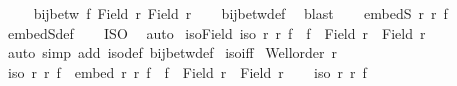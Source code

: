 \begin{isabellebody}
\ \ \isamarkupfalse%
\ {\isachardoublequoteopen}{\isasymnot}\ bij{\isacharunderscore}{\kern0pt}betw\ f\ {\isacharparenleft}{\kern0pt}Field\ r{\isacharparenright}{\kern0pt}\ {\isacharparenleft}{\kern0pt}Field\ r{\isacharprime}{\kern0pt}{\isacharparenright}{\kern0pt}{\isachardoublequoteclose}\isanewline
\ \ \isamarkupfalse%
\ bij{\isacharunderscore}{\kern0pt}betw{\isacharunderscore}{\kern0pt}def\ \isamarkupfalse%
\ blast\isanewline
\ \ \isamarkupfalse%
\ {\isachardoublequoteopen}embedS\ r\ r{\isacharprime}{\kern0pt}\ f{\isachardoublequoteclose}\ \isamarkupfalse%
\ embedS{\isacharunderscore}{\kern0pt}def\isanewline
\ \ \isamarkupfalse%
\ ISO\ \isamarkupfalse%
\ auto\isanewline
{}\isamarkupfalse%
%
\endisatagproof
{\isafoldproof}%
%
\isadelimproof
\isanewline
%
\endisadelimproof
\isanewline
{}\isamarkupfalse%
\ iso{\isacharunderscore}{\kern0pt}Field{\isacharcolon}{\kern0pt}\ {\isachardoublequoteopen}iso\ r\ r{\isacharprime}{\kern0pt}\ f\ {\isasymLongrightarrow}\ f\ {\isacharbackquote}{\kern0pt}\ {\isacharparenleft}{\kern0pt}Field\ r{\isacharparenright}{\kern0pt}\ {\isacharequal}{\kern0pt}\ Field\ r{\isacharprime}{\kern0pt}{\isachardoublequoteclose}\isanewline
%
\isadelimproof
\ \ %
\endisadelimproof
%
\isatagproof
{}\isamarkupfalse%
\ {\isacharparenleft}{\kern0pt}auto\ simp\ add{\isacharcolon}{\kern0pt}\ iso{\isacharunderscore}{\kern0pt}def\ bij{\isacharunderscore}{\kern0pt}betw{\isacharunderscore}{\kern0pt}def{\isacharparenright}{\kern0pt}%
\endisatagproof
{\isafoldproof}%
%
\isadelimproof
\isanewline
%
\endisadelimproof
\isanewline
{}\isamarkupfalse%
\ iso{\isacharunderscore}{\kern0pt}iff{\isacharcolon}{\kern0pt}\isanewline
{}\ {\isachardoublequoteopen}Well{\isacharunderscore}{\kern0pt}order\ r{\isachardoublequoteclose}\isanewline
{}\ {\isachardoublequoteopen}iso\ r\ r{\isacharprime}{\kern0pt}\ f\ {\isacharequal}{\kern0pt}\ {\isacharparenleft}{\kern0pt}embed\ r\ r{\isacharprime}{\kern0pt}\ f\ {\isasymand}\ f\ {\isacharbackquote}{\kern0pt}\ {\isacharparenleft}{\kern0pt}Field\ r{\isacharparenright}{\kern0pt}\ {\isacharequal}{\kern0pt}\ Field\ r{\isacharprime}{\kern0pt}{\isacharparenright}{\kern0pt}{\isachardoublequoteclose}\isanewline
%
\isadelimproof
%
\endisadelimproof
%
\isatagproof
{}\isamarkupfalse%
\isanewline
\ \ \isamarkupfalse%
\ {\isachardoublequoteopen}iso\ r\ r{\isacharprime}{\kern0pt}\ f{\isachardoublequoteclose}\isanewline

\end{isabellebody}
